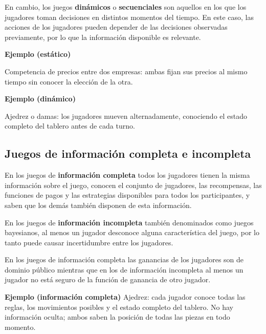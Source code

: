 \documentclass[12pt,a4paper,]{book}
\numberwithin{dummy}{section}
\theoremstyle{ocrenumbox}
\theoremstyle{blacknumex}
\theoremstyle{blacknumbox}
\theoremstyle{ocrenum}
\theoremstyle{ocrenum}
\begin{document}
En cambio, los juegos \textbf{dinámicos} o \textbf{secuenciales} son
aquellos en los que los jugadores toman decisiones en distintos momentos
del tiempo. En este caso, las acciones de los jugadores pueden depender
de las decisiones observadas previamente, por lo que la información
disponible es relevante.

\begin{tcolorbox}[colback=blue!10]
\textbf{Ejemplo (estático)}

Competencia de precios entre dos empresas: ambas fijan sus precios al mismo tiempo sin conocer la elección de la otra.
\end{tcolorbox}

\begin{tcolorbox}[colback=blue!10]
\textbf{Ejemplo (dinámico)}

Ajedrez o damas: los jugadores mueven alternadamente, conociendo el estado completo del tablero antes de cada turno.
\end{tcolorbox}

\subsection{Juegos de información completa e
incompleta}\label{juegos-de-informaciuxf3n-completa-e-incompleta}

En los juegos de \textbf{información completa} todos los jugadores
tienen la misma información sobre el juego, conocen el conjunto de
jugadores, las recompensas, las funciones de pagos y las estrategias
disponibles para todos los participantes, y saben que los demás también
disponen de esta información.

En los juegos de \textbf{información incompleta} también denominados
como juegos bayesianos, al menos un jugador desconoce alguna
característica del juego, por lo tanto puede causar incertidumbre entre
los jugadores.

En los juegos de información completa las ganancias de los jugadores son
de dominio público mientras que en los de información incompleta al
menos un jugador no está seguro de la función de ganancia de otro
jugador.

\begin{tcolorbox}[colback=blue!10]
\textbf{Ejemplo (información completa)}
Ajedrez: cada jugador conoce todas las reglas, los movimientos posibles y el estado completo del tablero.  
No hay información oculta; ambos saben la posición de todas las piezas en todo momento.
\end{tcolorbox}
\end{document}
